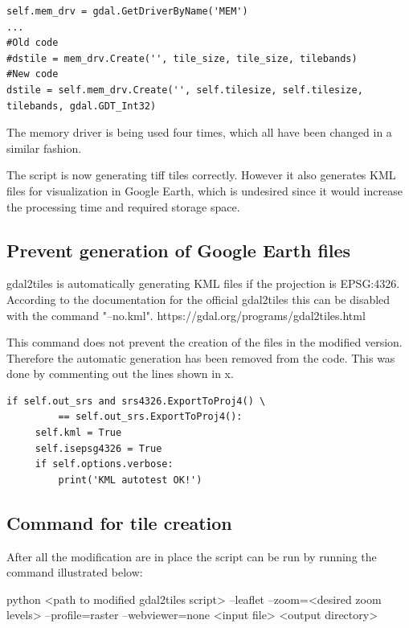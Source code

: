 \begin{lstlisting}[language=iPython, caption={Increasing the bit depth}, label= VoresPY,escapechar=|]
self.mem_drv = gdal.GetDriverByName('MEM')
...
#Old code
#dstile = mem_drv.Create('', tile_size, tile_size, tilebands)
#New code
dstile = self.mem_drv.Create('', self.tilesize, self.tilesize, tilebands, gdal.GDT_Int32)
\end{lstlisting}
The memory driver is being used four times, which all have been changed in a similar fashion.


The script is now generating tiff tiles correctly. However it also generates KML files for visualization in Google Earth, which is undesired since it would increase the processing time and required storage space. 
\subsection{Prevent generation of Google Earth files}
gdal2tiles is automatically generating KML files if the projection is EPSG:4326. According to the documentation for the official gdal2tiles this can be disabled with the command "--no.kml".
https://gdal.org/programs/gdal2tiles.html


This command does not prevent the creation of the files in the modified version. Therefore the automatic generation has been removed from the code. This was done by commenting out the lines shown in x. 

\begin{lstlisting}[language=iPython, caption={Increasing the bit depth}, label= KML,escapechar=|]
 if self.out_srs and srs4326.ExportToProj4() \
         == self.out_srs.ExportToProj4():
     self.kml = True
     self.isepsg4326 = True
     if self.options.verbose:
         print('KML autotest OK!')
\end{lstlisting}
        



\subsection{Command for tile creation}

After all the modification are in place the script can be run by running the command illustrated below:


python <path to modified gdal2tiles script> --leaflet --zoom=<desired zoom levels> --profile=raster --webviewer=none <input file> <output directory>



